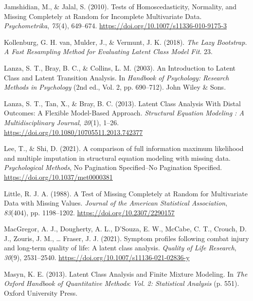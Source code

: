 \documentclass[
  ,man,floatsintext]{apa6}
\newlength{\cslhangindent}
\newlength{\cslentryspacingunit} %
\newenvironment{CSLReferences}[2] %
 {%
  \setlength{\parindent}{0pt}
  \ifodd #1
  \let\oldpar\par
  \def\par{\hangindent=\cslhangindent\oldpar}
  \fi
  \setlength{\parskip}{#2\cslentryspacingunit}
 }%
 {}
\begin{document}
\begin{CSLReferences}{1}{0}
\leavevmode{}%
Jamshidian, M., \& Jalal, S. (2010). Tests of {Homoscedasticity}, {Normality}, and {Missing} {Completely} at {Random} for {Incomplete} {Multivariate} {Data}. \emph{Psychometrika}, \emph{75}(4), 649--674. \url{https://doi.org/10.1007/s11336-010-9175-3}

\leavevmode{}%
Kollenburg, G. H. van, Mulder, J., \& Vermunt, J. K. (2018). \emph{The {Lazy} {Bootstrap}. {A} {Fast} {Resampling} {Method} for {Evaluating} {Latent} {Class} {Model} {Fit}}. 23.

\leavevmode{}%
Lanza, S. T., Bray, B. C., \& Collins, L. M. (2003). An {Introduction} to {Latent} {Class} and {Latent} {Transition} {Analysis}. In \emph{Handbook of {Psychology}: {Research} {Methods} in {Psychology}} (2nd ed., Vol. 2, pp. 690--712). John Wiley \& Sons.

\leavevmode{}%
Lanza, S. T., Tan, X., \& Bray, B. C. (2013). Latent {Class} {Analysis} {With} {Distal} {Outcomes}: {A} {Flexible} {Model}-{Based} {Approach}. \emph{Structural Equation Modeling : A Multidisciplinary Journal}, \emph{20}(1), 1--26. \url{https://doi.org/10.1080/10705511.2013.742377}

\leavevmode{}%
Lee, T., \& Shi, D. (2021). A comparison of full information maximum likelihood and multiple imputation in structural equation modeling with missing data. \emph{Psychological Methods}, No Pagination Specified--No Pagination Specified. \url{https://doi.org/10.1037/met0000381}

\leavevmode{}%
Little, R. J. A. (1988). A {Test} of {Missing} {Completely} at {Random} for {Multivariate} {Data} with {Missing} {Values}. \emph{Journal of the American Statistical Association}, \emph{83}(404), pp. 1198--1202. \url{https://doi.org/10.2307/2290157}

\leavevmode{}%
MacGregor, A. J., Dougherty, A. L., D'Souza, E. W., McCabe, C. T., Crouch, D. J., Zouris, J. M., \ldots{} Fraser, J. J. (2021). Symptom profiles following combat injury and long-term quality of life: A latent class analysis. \emph{Quality of Life Research}, \emph{30}(9), 2531--2540. \url{https://doi.org/10.1007/s11136-021-02836-y}

\leavevmode{}%
Masyn, K. E. (2013). Latent {Class} {Analysis} and {Finite} {Mixture} {Modeling}. In \emph{The {Oxford} {Handbook} of {Quantitative} {Methods}}: \emph{Vol.} \emph{2: Statistical Analysis} (p. 551). Oxford University Press.


\end{CSLReferences}
\end{document}
